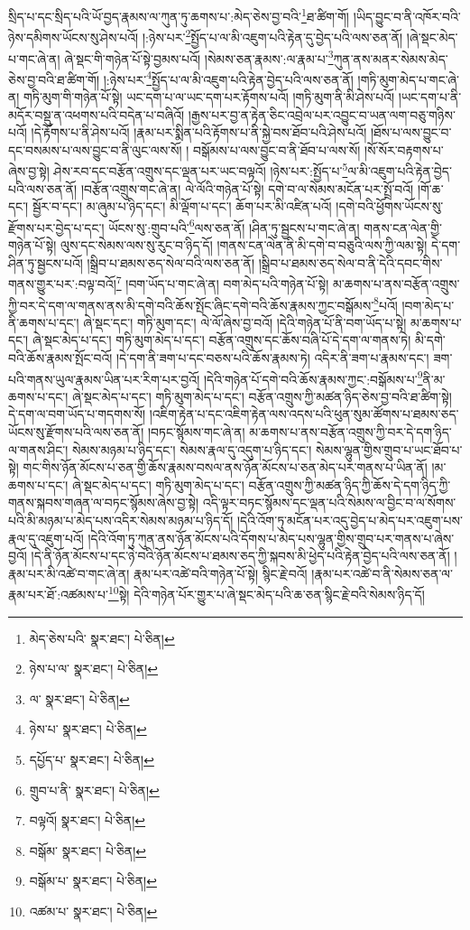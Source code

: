 སྲིད་པ་དང་སྲིད་པའི་ཡོ་བྱད་རྣམས་ལ་ཀུན་ཏུ་ཆགས་པ་:མེད་ཅེས་བྱ་བའི་\footnote{མེད་ཅེས་པའི་  སྣར་ཐང་།  པེ་ཅིན། }ཐ་ཚིག་གོ། །ཡིད་བྱུང་བ་ནི་འཁོར་བའི་ཉེས་དམིགས་ཡོངས་སུ་ཤེས་པའོ། །:ཉེས་པར་\footnote{ཉེས་པ་ལ་  སྣར་ཐང་།  པེ་ཅིན། }སྤྱོད་པ་ལ་མི་འཇུག་པའི་རྟེན་དུ་བྱེད་པའི་ལས་ཅན་ནོ། །ཞེ་སྡང་མེད་པ་གང་ཞེ་ན། ཞེ་སྡང་གི་གཉེན་པོ་སྟེ་བྱམས་པའོ། །སེམས་ཅན་རྣམས་:ལ་རྣམ་པ་\footnote{ལ་  སྣར་ཐང་།  པེ་ཅིན། }ཀུན་ནས་མནར་སེམས་མེད་ཅེས་བྱ་བའི་ཐ་ཚིག་གོ། །:ཉེས་པར་\footnote{ཉེས་པ་  སྣར་ཐང་།  པེ་ཅིན། }སྤྱོད་པ་ལ་མི་འཇུག་པའི་རྟེན་བྱེད་པའི་ལས་ཅན་ནོ། །གཏི་མུག་མེད་པ་གང་ཞེ་ན། གཏི་མུག་གི་གཉེན་པོ་སྟེ། ཡང་དག་པ་ལ་ཡང་དག་པར་རྟོགས་པའོ། །གཏི་མུག་ནི་མི་ཤེས་པའོ། །ཡང་དག་པ་ནི་མདོར་བསྡུ་ན་འཕགས་པའི་བདེན་པ་བཞིའོ། །རྒྱས་པར་བྱ་ན་རྟེན་ཅིང་འབྲེལ་པར་འབྱུང་བ་ཡན་ལག་བཅུ་གཉིས་པའོ། །དེ་རྟོགས་པ་ནི་ཤེས་པའོ། །རྣམ་པར་སྨིན་པའི་རྟོགས་པ་ནི་སྐྱེ་བས་ཐོབ་པའི་ཤེས་པའོ། །ཐོས་པ་ལས་བྱུང་བ་དང་བསམས་པ་ལས་བྱུང་བ་ནི་ལུང་ལས་སོ། །
བསྒོམས་པ་ལས་བྱུང་བ་ནི་ཐོབ་པ་ལས་སོ། །སོ་སོར་བརྟགས་པ་ཞེས་བྱ་སྟེ། ཤེས་རབ་དང་བརྩོན་འགྲུས་དང་ལྡན་པར་ཡང་བལྟའོ། །ཉེས་པར་:སྤྱོད་པ་\footnote{དཔྱོད་པ་  སྣར་ཐང་།  པེ་ཅིན། }ལ་མི་འཇུག་པའི་རྟེན་བྱེད་པའི་ལས་ཅན་ནོ། །བརྩོན་འགྲུས་གང་ཞེ་ན། ལེ་ལོའི་གཉེན་པོ་སྟེ། དགེ་བ་ལ་སེམས་མངོན་པར་སྤྲོ་བའོ། །གོ་ཆ་དང་། སྦྱོར་བ་དང་། མ་ཞུམ་པ་ཉིད་དང་། མི་ལྡོག་པ་དང་། ཆོག་པར་མི་འཛིན་པའོ། །དགེ་བའི་ཕྱོགས་ཡོངས་སུ་རྫོགས་པར་བྱེད་པ་དང་། ཡོངས་སུ་:གྲུབ་པའི་\footnote{གྲུབ་པ་ནི་  སྣར་ཐང་།  པེ་ཅིན། }ལས་ཅན་ནོ། །ཤིན་ཏུ་སྦྱངས་པ་གང་ཞེ་ན། གནས་ངན་ལེན་གྱི་གཉེན་པོ་སྟེ། ལུས་དང་སེམས་ལས་སུ་རུང་བ་ཉིད་དོ། །གནས་ངན་ལེན་ནི་མི་དགེ་བ་བཅུའི་ལས་ཀྱི་ལམ་སྟེ། དེ་དག་ཤིན་ཏུ་སྦྱངས་པའོ། །སྒྲིབ་པ་ཐམས་ཅད་སེལ་བའི་ལས་ཅན་ནོ། །སྒྲིབ་པ་ཐམས་ཅད་སེལ་བ་ནི་དེའི་དབང་གིས་གནས་གྱུར་པར་:བལྟ་བའོ།\footnote{བལྟའོ།  སྣར་ཐང་།  པེ་ཅིན། } །བག་ཡོད་པ་གང་ཞེ་ན། བག་མེད་པའི་གཉེན་པོ་སྟེ། མ་ཆགས་པ་ནས་བརྩོན་འགྲུས་ཀྱི་བར་དེ་དག་ལ་གནས་ནས་མི་དགེ་བའི་ཆོས་སྤོང་ཞིང་དགེ་བའི་ཆོས་རྣམས་ཀྱང་བསྒོམས་\footnote{བསྒོམ་  སྣར་ཐང་།  པེ་ཅིན། }པའོ། །བག་མེད་པ་ནི་ཆགས་པ་དང་། ཞེ་སྡང་དང་། གཏི་མུག་དང་། ལེ་ལོ་ཞེས་བྱ་བའོ། །དེའི་གཉེན་པོ་ནི་བག་ཡོད་པ་སྟེ། མ་ཆགས་པ་དང་། ཞེ་སྡང་མེད་པ་དང་། གཏི་མུག་མེད་པ་དང་། བརྩོན་འགྲུས་དང་ཆོས་བཞི་པོ་དེ་དག་ལ་གནས་ཏེ། མི་དགེ་བའི་ཆོས་རྣམས་སྤོང་བའོ། །དེ་དག་ནི་ཟག་པ་དང་བཅས་པའི་ཆོས་རྣམས་ཏེ། འདིར་ནི་ཟག་པ་རྣམས་དང་། ཟག་པའི་གནས་ཡུལ་རྣམས་ཡིན་པར་རིག་པར་བྱའོ། །དེའི་གཉེན་པོ་དགེ་བའི་ཆོས་རྣམས་ཀྱང་:བསྒོམས་པ་\footnote{བསྒོམ་པ་  སྣར་ཐང་།  པེ་ཅིན། }ནི་མ་ཆགས་པ་དང་། ཞེ་སྡང་མེད་པ་དང་། གཏི་མུག་མེད་པ་དང་། བརྩོན་འགྲུས་ཀྱི་མཚན་ཉིད་ཅེས་བྱ་བའི་ཐ་ཚིག་སྟེ། དེ་དག་ལ་བག་ཡོད་པ་གདགས་སོ། །འཇིག་རྟེན་པ་དང་འཇིག་རྟེན་ལས་འདས་པའི་ཕུན་སུམ་ཚོགས་པ་ཐམས་ཅད་ཡོངས་སུ་རྫོགས་པའི་ལས་ཅན་ནོ། །བཏང་སྙོམས་གང་ཞེ་ན། མ་ཆགས་པ་ནས་བརྩོན་འགྲུས་ཀྱི་བར་དེ་དག་ཉིད་ལ་གནས་ཤིང་། སེམས་མཉམ་པ་ཉིད་དང་། སེམས་རྣལ་དུ་འདུག་པ་ཉིད་དང་། སེམས་ལྷུན་གྱིས་གྲུབ་པ་ཡང་ཐོབ་པ་སྟེ། གང་གིས་ཉོན་མོངས་པ་ཅན་གྱི་ཆོས་རྣམས་བསལ་ནས་ཉོན་མོངས་པ་ཅན་མེད་པར་གནས་པ་ཡིན་ནོ། །མ་ཆགས་པ་དང་། ཞེ་སྡང་མེད་པ་དང་། གཏི་མུག་མེད་པ་དང་། བརྩོན་འགྲུས་ཀྱི་མཚན་ཉིད་ཀྱི་ཆོས་དེ་དག་ཉིད་ཀྱི་གནས་སྐབས་གཞན་ལ་བཏང་སྙོམས་ཞེས་བྱ་སྟེ། འདི་ལྟར་བཏང་སྙོམས་དང་ལྡན་པའི་སེམས་ལ་བྱིང་བ་ལ་སོགས་པའི་མི་མཉམ་པ་མེད་པས་འདིར་སེམས་མཉམ་པ་ཉིད་དོ། །དེའི་འོག་ཏུ་མངོན་པར་འདུ་བྱེད་པ་མེད་པར་འཇུག་པས་རྣལ་དུ་འཇུག་པའོ། །དེའི་འོག་ཏུ་ཀུན་ནས་ཉོན་མོངས་པའི་དོགས་པ་མེད་པས་ལྷུན་གྱིས་གྲུབ་པར་གནས་པ་ཞེས་བྱའོ། །དེ་ནི་ཉོན་མོངས་པ་དང་ཉེ་བའི་ཉོན་མོངས་པ་ཐམས་ཅད་ཀྱི་སྐབས་མི་ཕྱེད་པའི་རྟེན་བྱེད་པའི་ལས་ཅན་ནོ། །རྣམ་པར་མི་འཚེ་བ་གང་ཞེ་ན། རྣམ་པར་འཚེ་བའི་གཉེན་པོ་སྟེ། སྙིང་རྗེ་བའོ། །རྣམ་པར་འཚེ་བ་ནི་སེམས་ཅན་ལ་རྣམ་པར་ཐོ་:འཚམས་པ་\footnote{འཚམ་པ་  སྣར་ཐང་།  པེ་ཅིན། }སྟེ། དེའི་གཉེན་པོར་གྱུར་པ་ཞེ་སྡང་མེད་པའི་ཆ་ཅན་སྙིང་རྗེ་བའི་སེམས་ཉིད་དོ། 